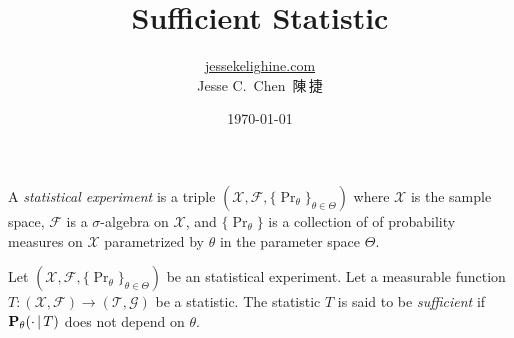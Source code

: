 \documentclass[a4paper]{article}
\title{Sufficient Statistic}
\author{\href{https://jessekelighine.com}{jessekelighine.com}\\Jesse C.\ Chen\ 陳\,捷}
\date{\today}
\begin{document}
\maketitle

\begin{definition}
	A \emph{statistical experiment} is a triple $(\mathcal{X},\mathcal{F},\{\Pr_{\theta}\}_{\theta\in\Theta})$ where
	$\mathcal{X}$ is the sample space,
	$\mathcal{F}$ is a $\sigma$-algebra on $\mathcal{X}$, and
	$\{\Pr_{\theta}\}$ is a collection of of probability measures on $\mathcal{X}$ parametrized by $\theta$ in the parameter space $\Theta$.
\end{definition}

\begin{definition}
	Let $(\mathcal{X},\mathcal{F},\{\Pr_{\theta}\}_{\theta\in\Theta})$ be an statistical experiment.
	Let a measurable function $T:(\mathcal{X},\mathcal{F})\to(\mathcal{T},\mathcal{G})$ be a statistic.
	The statistic $T$ is said to be \emph{sufficient} if $\operatorname{\text{\textrm{\upshape\textbf{P}}}}_{\theta}(\cdot\,|\, T)$ does not depend on $\theta$.
\end{definition}

\end{document}
